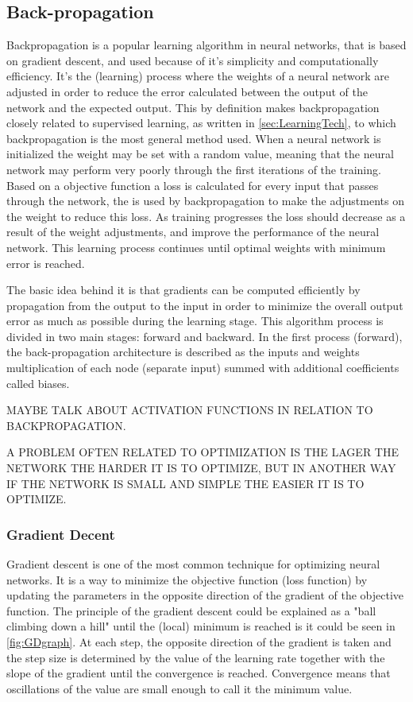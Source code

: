   
\subsection{Back-propagation}
Backpropagation is a popular learning algorithm in neural networks, that is based on gradient descent, and used because of it's simplicity and computationally efficiency. \citep{Bengio2012, Duda2000} It's the (learning) process where the weights of a neural network are adjusted in order to reduce the error calculated between the output of the network and the expected output. This by definition makes backpropagation closely related to supervised learning, as written in \ref{sec:LearningTech}, to which backpropagation is the most general method used.\citep{Duda2000}  
When a neural network is initialized the weight may be set with a random value, meaning that the neural network may perform very poorly through the first iterations of the training. Based on a objective function a loss is calculated for every input that passes through the network, the is used by backpropagation to make the adjustments on the weight to reduce this loss. As training progresses the loss should decrease as a result of the weight adjustments, and improve the performance of the neural network. \citep{LeCun2015, Duda2000, Goodfellow2016}   
This learning process continues until optimal weights with minimum error is reached.\citep{Hameed2016}

The basic idea behind it is that gradients can be computed efficiently by propagation from the output to the input in order to minimize the overall output error as much as possible during the learning stage. This algorithm process is divided in two main stages: forward and backward. In the first process (forward), the back-propagation architecture is described as  the inputs and weights multiplication of each node (separate input) summed with additional coefficients called biases.\citep{Hameed2016,LeCun1998} 

MAYBE TALK ABOUT ACTIVATION FUNCTIONS IN RELATION TO BACKPROPAGATION. 

A PROBLEM OFTEN RELATED TO OPTIMIZATION IS THE LAGER THE NETWORK THE HARDER IT IS TO OPTIMIZE, BUT IN ANOTHER WAY IF THE NETWORK IS SMALL AND SIMPLE THE EASIER IT IS TO OPTIMIZE. 


\subsubsection{Gradient Decent}
Gradient descent is one of the most common technique for optimizing neural networks. It is a way to minimize the objective function (loss function) by updating the parameters in the opposite direction of the gradient of the objective function.\citep{Ruder2016} The principle of the gradient descent could be explained as a "ball climbing down a hill" until the (local) minimum is reached is it could be seen in \autoref{fig:GDgraph}. At each step, the opposite direction of the gradient is taken and the step size is determined by the value of the learning rate together with the slope of the gradient until the convergence is reached. Convergence means that oscillations of the value are small enough to call it the minimum value.\citep{Raschka2016}

